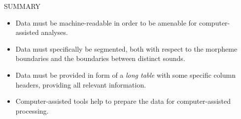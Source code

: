 \documentclass[xetex,svgnames]{scrartcl}
\begin{document}


%
%

\begin{center}
  \hline
  SUMMARY \\\hline
  \begin{itemize}
    \item Data must be machine-readable in order to be amenable for computer-assisted analyses.
    \item Data must specifically be segmented, both with respect to the morpheme boundaries and the
      boundaries between distinct sounds.
    \item Data must be provided in form of a \emph{long table} with some specific column headers,
      providing all relevant information.
    \item Computer-assisted tools help to prepare the data for computer-assisted processing.
  \end{itemize}\\\hline
  \endtabular
\end{center}
\end{document}
